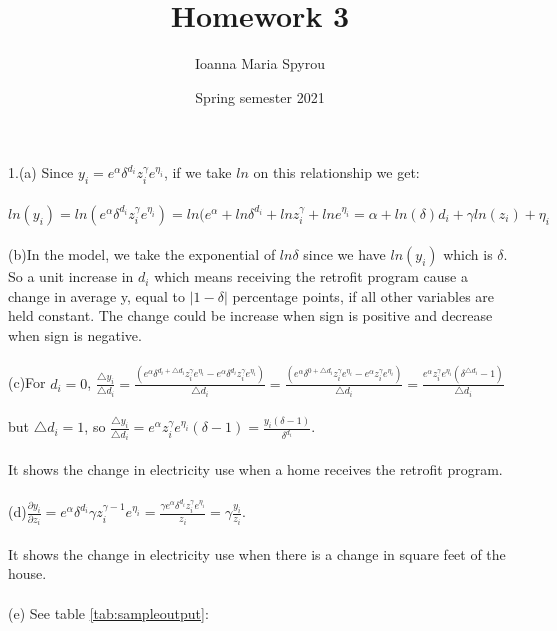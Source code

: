 \documentclass{article}
\title{Homework 3}
\author{Ioanna Maria Spyrou}
\date{Spring semester 2021}
\begin{document}
  
\maketitle


1.(a) Since $y_i = e^{\alpha}\delta^{d_i}z_i^{\gamma}e^{\eta_i}$, if we take $ln$ on this relationship we get:\\
\\
$ln(y_i) = ln(e^{\alpha}\delta^{d_i}z_i^{\gamma}e^{\eta_i}) = ln(e^{\alpha} + ln\delta^{d_i} + lnz_i^{\gamma} + lne^{\eta_i} = \alpha + ln(\delta) d_i + \gamma ln(z_i) + \eta_i $\\
\\
(b)In the model, we take the exponential of $ln\delta$ since we have $ln(y_i)$ which is $\delta$. So a unit increase in $d_i$ which means receiving the retrofit program cause a change in average y, equal to $|1-\delta|$ percentage points, if all other variables are held constant. The change could be increase when sign is positive and decrease when sign is negative.\\
\\
(c)For $d_i=0$, $\frac{\bigtriangleup{y_i}}{\bigtriangleup{d_i}} = \frac{(e^{\alpha}\delta^{d_i + \bigtriangleup{d_i} }z_i^{\gamma}e^{\eta_i} - e^{\alpha}\delta^{d_i}z_i^{\gamma}e^{\eta_i})}{\bigtriangleup{d_i}}=\frac {(e^{\alpha}\delta^{0 + \bigtriangleup{d_i} }z_i^{\gamma}e^{\eta_i} - e^{\alpha}z_i^{\gamma}e^{\eta_i})}{\bigtriangleup{d_i}} = \frac{e^{\alpha}z_i^{\gamma}e^{\eta_i}(\delta^{\bigtriangleup{d_i}} - 1)}{\bigtriangleup{d_i}}$\\
\\but $\bigtriangleup{d_i} = 1$, so
 $\frac{\bigtriangleup{y_i}}{\bigtriangleup{d_i}} = e^{\alpha}z_i^{\gamma}e^{\eta_i} (\delta - 1) = \frac {y_i(\delta - 1)}{\delta^{d_i}} $.\\ 
 \\It shows the change in electricity use when a home receives the retrofit program.\\
\\
(d)$\frac{\partial y_i}{\partial z_i} = e^{\alpha}\delta^{d_i}\gamma z_i^{\gamma-1}e^{\eta_i} = \frac{\gamma e^{\alpha}\delta^{d_i} z_i^{\gamma}e^{\eta_i}}{z_i} = \gamma \frac{y_i}{z_i} $.\\
\\
It shows the change in electricity use when there is a change in square feet of the house.\\
\\
(e) See table \ref{tab:sampleoutput}:
\end{document}

